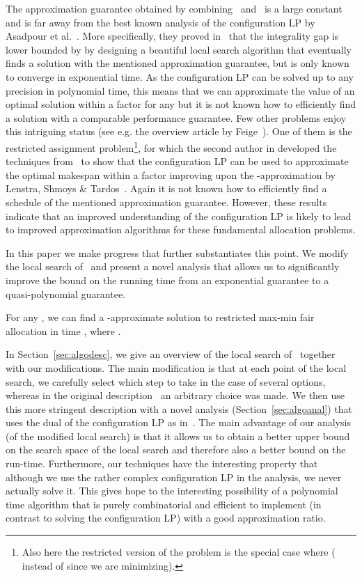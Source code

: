 \documentclass{llncs}
\begin{document}
The approximation guarantee obtained by combining~\cite{Feige08}
and~\cite{HSS10} is a large constant and is far away from the best
known analysis of the configuration LP by Asadpour et
al.~\cite{AFS08}.
More specifically, they proved in~\cite{AFS08} that the integrality
gap is lower bounded by  by designing a beautiful local search
algorithm that eventually finds a solution with the mentioned
approximation guarantee, but is only known to converge in exponential
time.  As the configuration LP can be solved up to any precision in
polynomial time, this means that we can approximate the value of an
optimal solution within a factor  for any  but it is not known how to efficiently find a solution with a
comparable performance guarantee. Few other problems enjoy this
intriguing status (see e.g. the overview article by
Feige~\cite{FeigeSurv08}). One of them is the restricted assignment
problem\footnote{Also here the restricted version of the  problem is the special case where  ( instead of  since we are minimizing).},
  for which the second author in \cite{SME11} developed the techniques
from~\cite{AFS08} to show that the configuration LP can be used to
approximate the optimal makespan within a factor 
improving upon the -approximation by Lenstra, Shmoys \&
Tardos~\cite{LST90}. Again it is not known how to efficiently find a
schedule of the mentioned approximation guarantee. However, these
results indicate that an improved understanding of the configuration
LP is likely to lead to improved approximation algorithms for these
fundamental allocation problems.


In this paper we make progress that further substantiates this
point. We modify the local search of~\cite{AFS08} and present
a novel analysis that allows us to significantly improve the bound on the
running time from an exponential guarantee to a quasi-polynomial
guarantee.
\begin{theorem}
\label{thm:main}
  For any , we can find a
  -approximate solution to  restricted
  max-min fair allocation in time , where .
\end{theorem}

In Section~\ref{sec:algodesc}, we give an overview of the local search
of~\cite{AFS08} together with our modifications. The main modification
is that at each point of the local search, we carefully select which step
to take in the case of several options, whereas in the original
description~\cite{AFS08} an arbitrary choice was made. We then use
this more stringent description with a novel analysis (Section~\ref{sec:algoanal})
that uses the dual of the configuration LP as in~\cite{SME11}. The
main advantage of our analysis (of the modified local search) is that
it allows us to obtain a better upper bound on the search space of the
local search and therefore also a better bound on the run-time.
Furthermore, our techniques have the interesting property that
although we use the rather complex configuration LP in the analysis,
we never actually solve it.  This gives hope to the interesting
possibility of a polynomial time algorithm that is purely
combinatorial and efficient to implement (in contrast to solving the
configuration LP) with a good approximation ratio.
\end{document}
